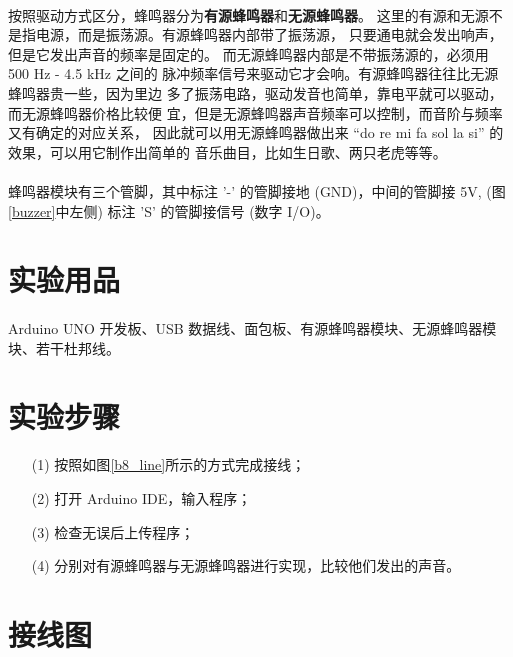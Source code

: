 \documentclass[UTF8, oneside]{ctexbook}
\begin{document}
\paragraph{}
按照驱动方式区分，蜂鸣器分为\textbf{有源蜂鸣器}和\textbf{无源蜂鸣器}。
这里的有源和无源不是指电源，而是振荡源。有源蜂鸣器内部带了振荡源，
只要通电就会发出响声，但是它发出声音的频率是固定的。
而无源蜂鸣器内部是不带振荡源的，必须用 500 Hz - 4.5 kHz 之间的
脉冲频率信号来驱动它才会响。有源蜂鸣器往往比无源蜂鸣器贵一些，因为里边
多了振荡电路，驱动发音也简单，靠电平就可以驱动，而无源蜂鸣器价格比较便
宜，但是无源蜂鸣器声音频率可以控制，而音阶与频率又有确定的对应关系，
因此就可以用无源蜂鸣器做出来 “do re mi fa sol la si” 的效果，可以用它制作出简单的
音乐曲目，比如生日歌、两只老虎等等。

\paragraph{}
蜂鸣器模块有三个管脚，其中标注 '-' 的管脚接地 (GND)，中间的管脚接 5V, (图\ref{buzzer}中左侧) 标注 'S' 
的管脚接信号 (数字 I/O)。

\section{实验用品}
\paragraph{}
Arduino UNO 开发板、USB 数据线、面包板、有源蜂鸣器模块、无源蜂鸣器模块、若干杜邦线。

\section{实验步骤}
\begin{itemize}
    \item[(1)] 按照如图\ref{b8_line}所示的方式完成接线；
    \item[(2)] 打开 Arduino IDE，输入程序；
    \item[(3)] 检查无误后上传程序；
    \item[(4)] 分别对有源蜂鸣器与无源蜂鸣器进行实现，比较他们发出的声音。
\end{itemize}

\section{接线图}
\end{document}
